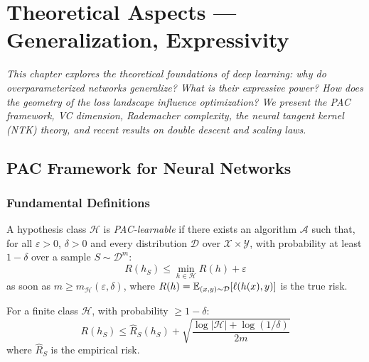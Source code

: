 \chapter{Theoretical Aspects --- Generalization, Expressivity}
\label{ch:theory}

\noindent\textit{This chapter explores the theoretical foundations of deep learning:
why do overparameterized networks generalize? What is their expressive
power? How does the geometry of the loss landscape influence optimization?
We present the PAC framework, VC dimension, Rademacher complexity, the
neural tangent kernel (NTK) theory, and recent results on double descent
and scaling laws.}\medskip

\section{PAC Framework for Neural Networks}
\label{sec:pac-learning}

\subsection{Fundamental Definitions}

\begin{definition}
\label{def:pac}
A hypothesis class $\mathcal{H}$ is \emph{PAC-learnable} if there exists
an algorithm $\mathcal{A}$ such that, for all $\varepsilon > 0$, $\delta > 0$
and every distribution $\mathcal{D}$ over $\mathcal{X} \times \mathcal{Y}$,
with probability at least $1 - \delta$ over a sample
$S \sim \mathcal{D}^m$:
\begin{equation}
R(h_S) \leq \min_{h \in \mathcal{H}} R(h) + \varepsilon
\end{equation}
as soon as $m \geq m_{\mathcal{H}}(\varepsilon, \delta)$, where
$R(h) = \mathbb{E}_{(x,y) \sim \mathcal{D}}[\ell(h(x), y)]$ is the true risk.
\end{definition}

\begin{theorem}
\label{thm:pac-bound}
For a finite class $\mathcal{H}$, with probability $\geq 1 - \delta$:
\begin{equation}
R(h_S) \leq \hat{R}_S(h_S) + \sqrt{\frac{\log|\mathcal{H}| + \log(1/\delta)}{2m}}
\end{equation}
where $\hat{R}_S$ is the empirical risk.
\end{theorem}

